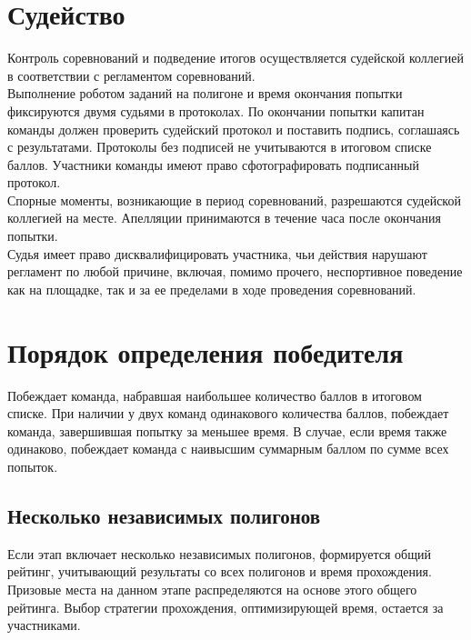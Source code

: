 \documentclass[12pt]{article}
\begin{document}
\section{Судейство} \hspace*{1cm}
Контроль соревнований и подведение итогов осуществляется судейской коллегией в соответствии с регламентом соревнований.
\\\hspace*{1cm}Выполнение роботом заданий на полигоне и время окончания попытки фиксируются двумя судьями в протоколах. По окончании попытки капитан команды должен проверить судейский протокол и поставить подпись, соглашаясь с результатами. Протоколы без подписей не учитываются в итоговом списке баллов. Участники команды имеют право сфотографировать подписанный протокол.
\\\hspace*{1cm}Спорные моменты, возникающие в период соревнований, разрешаются судейской коллегией на месте. Апелляции принимаются в течение часа после окончания попытки.
\\\hspace*{1cm}Судья имеет право дисквалифицировать участника, чьи действия нарушают регламент по любой причине, включая, помимо прочего, неспортивное поведение как на площадке, так и за ее пределами в ходе проведения соревнований.

\section{Порядок определения победителя} \hspace*{1cm}
Побеждает команда, набравшая наибольшее количество баллов в итоговом списке. При наличии у двух команд одинакового количества баллов, побеждает команда, завершившая попытку за меньшее время. В случае, если время также одинаково, побеждает команда с наивысшим суммарным баллом по сумме всех попыток.

\subsection{Несколько независимых полигонов} \hspace*{1cm}
Если этап включает несколько независимых полигонов, формируется общий рейтинг, учитывающий результаты со всех полигонов и время прохождения.  Призовые места на данном этапе распределяются на основе этого общего рейтинга.  Выбор стратегии прохождения, оптимизирующей время, остается за участниками.
\end{document}
